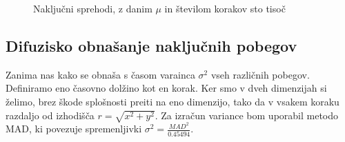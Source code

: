 \begin{figure}[h]
    \caption{Naključni sprehodi, z danim $\mu$ in številom korakov sto tisoč}
\end{figure}

\subsection{Difuzisko obnašanje naključnih pobegov}
Zanima nas kako se obnaša s časom varainca $\sigma^2$ vseh različnih pobegov.
Definiramo eno časovno dolžino kot en korak. Ker smo v dveh dimenzijah si želimo,
brez škode splošnosti preiti na eno dimenzijo, tako da v vsakem koraku razdaljo
od izhodišča $r = \sqrt{x^2 + y^2}$. Za izračun variance bom uporabil metodo MAD,
ki povezuje spremenljivki $\sigma^2 = \frac{MAD^2}{0.45494}$.

